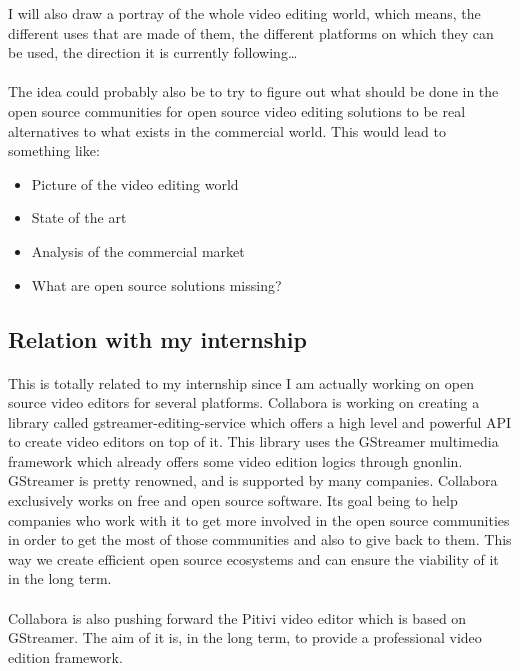       I will also draw a portray of the whole video editing world, which
      means, the different uses that are made of them, the different platforms on which
      they can be used, the  direction it is currently following\ldots

  \paragraph{}
    The idea could probably also be to try to figure out what should be done
    in the open source communities for open source video editing solutions
    to be real alternatives to what exists in the commercial world. This
    would lead to something like:
    \begin {itemize}
      \item{Picture of the video editing world}
      \item{State of the art}
      \item{Analysis of the commercial market}
      \item{What are open source solutions missing?}
    \end{itemize}

\subsection{Relation with my internship}
  \paragraph{}
    This is totally related to my internship since I am actually working on
    open source video editors for several platforms. Collabora is working
    on creating a library called gstreamer-editing-service which offers a
    high level and powerful API to create video editors on top of it. This
    library uses the GStreamer multimedia framework which already offers
    some video edition logics through gnonlin. GStreamer is pretty renowned,
    and is supported by many companies. Collabora exclusively works
    on free and open source software. Its goal being to help companies
    who work with it to get more involved in the open source communities in
    order to get the most of those communities and also to give back to them.
    This way we create efficient open source ecosystems and can ensure the viability
    of it in the long term.

  \paragraph{}
    Collabora is also pushing forward the Pitivi video editor which is
    based on GStreamer. The aim of it is, in the long term, to provide a
    professional video edition framework.

